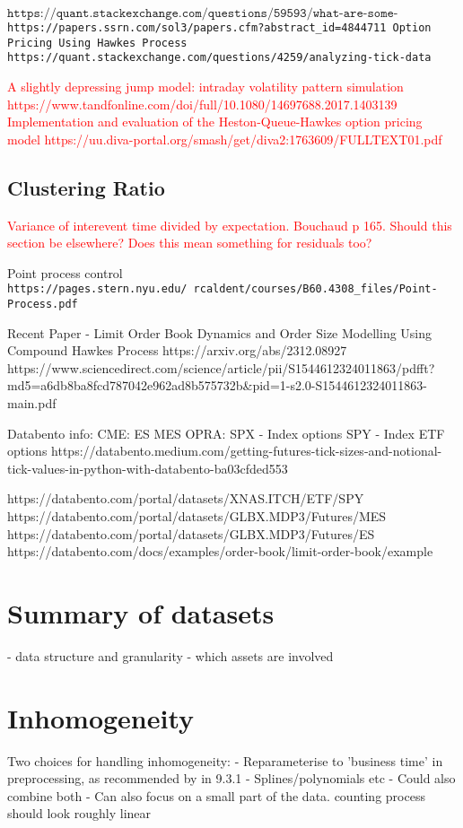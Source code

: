 \documentclass[honours,12pt]{unswthesis}
\numberwithin{equation}{section}
\begin{document}
$\texttt{https://quant.stackexchange.com/questions/59593/what-are-some-currently-open-problems-in-market-microstructure}$
\texttt{https://papers.ssrn.com/sol3/papers.cfm?abstract_id=4844711 Option Pricing Using Hawkes Process}
\texttt{https://quant.stackexchange.com/questions/4259/analyzing-tick-data}

\textcolor{red}{A slightly depressing jump model: intraday volatility pattern simulation https://www.tandfonline.com/doi/full/10.1080/14697688.2017.1403139}
\textcolor{red}{Implementation and evaluation of the Heston-Queue-Hawkes option pricing model https://uu.diva-portal.org/smash/get/diva2:1763609/FULLTEXT01.pdf}

\subsection{Clustering Ratio}
\textcolor{red}{Variance of interevent time divided by expectation. Bouchaud p 165. Should this section be elsewhere? Does this mean something for residuals too?}

Point process control \texttt{https://pages.stern.nyu.edu/~rcaldent/courses/B60.4308_files/Point-Process.pdf}


Recent Paper - Limit Order Book Dynamics and Order Size Modelling Using Compound Hawkes Process https://arxiv.org/abs/2312.08927 https://www.sciencedirect.com/science/article/pii/S1544612324011863/pdfft?md5=a6db8ba8fcd787042e962ad8b575732b&pid=1-s2.0-S1544612324011863-main.pdf


Databento info:
CME:
ES
MES
OPRA:
SPX - Index options
SPY - Index ETF options
https://databento.medium.com/getting-futures-tick-sizes-and-notional-tick-values-in-python-with-databento-ba03cfded553

https://databento.com/portal/datasets/XNAS.ITCH/ETF/SPY
https://databento.com/portal/datasets/GLBX.MDP3/Futures/MES
https://databento.com/portal/datasets/GLBX.MDP3/Futures/ES
https://databento.com/docs/examples/order-book/limit-order-book/example
\section{Summary of datasets}
- data structure and granularity
- which assets are involved

\section{Inhomogeneity}
Two choices for handling inhomogeneity:
- Reparameterise to 'business time' in preprocessing, as recommended by \cite{BouchaudEtAl} in 9.3.1
- Splines/polynomials etc
- Could also combine both
- Can also focus on a small part of the data. counting process should look roughly linear
\end{document}
